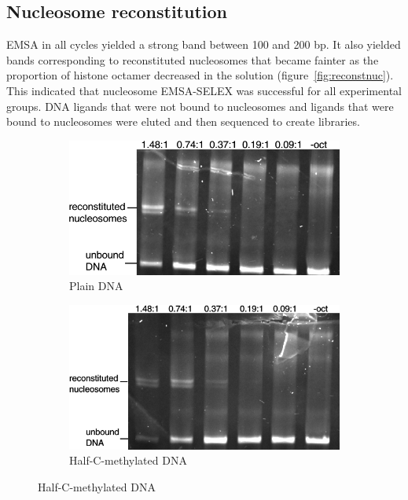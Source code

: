 \documentclass[parskip=full, numbers=noenddot]{scrreprt}
\begin{document}
\subsection{Nucleosome reconstitution}
\label{ssec:reconstnuc}

EMSA in all cycles yielded a strong band between 100 and 200 bp. It also yielded bands corresponding to reconstituted nucleosomes that became fainter as the proportion of histone octamer decreased in the solution (figure~\ref{fig:reconstnuc}).  This indicated that nucleosome EMSA-SELEX was successful for all experimental groups.  DNA ligands that were not bound to nucleosomes and ligands that were bound to nucleosomes were eluted and then sequenced to create libraries.

\begin{figure}[h]
  \centering
  \begin{subfigure}[htpb]{0.4\textwidth}
    \centering
    \includegraphics[width=\textwidth]{reconstnuc_a}
    \caption{Plain DNA}
    \label{fig:reconstnuc_a}
  \end{subfigure}
  \begin{subfigure}[htpb]{0.4\textwidth}
    \centering
    \includegraphics[width=\textwidth]{reconstnuc_b}
    \caption{Half-C-methylated DNA}

\end{subfigure}
\end{figure}
\end{document}
